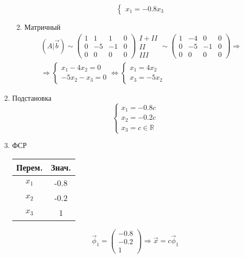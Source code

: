 \documentclass{article}
\begin{document}
\begin{enumerate}
\begin{enumerate}
\[\begin{cases}
			x_1 = -0.8x_3
		\end{cases}
		\]
		\item Матричный
		\begin{gather*}
			(A | \vec{b}) \sim \begin{pmatrix}
				1 & 1 & 1 & 0 \\
				0 & -5 & -1 & 0 \\
				0 & 0 & 0 & 0
			\end{pmatrix} \begin{matrix}
				 I + II \\ II \\ III
			\end{matrix} \sim
			\begin{pmatrix}
				1 & -4 & 0 & 0 \\
				0 & -5 & -1 & 0 \\
				0 & 0 & 0 & 0	
			\end{pmatrix} \Rightarrow \\
			\Rightarrow \begin{cases}
				x_1 - 4x_2 = 0 \\
				-5x_2 - x_3 = 0
			\end{cases} \Leftrightarrow \begin{cases}
				x_1 = 4x_2 \\
				x_3 = -5x_2
			\end{cases}
		\end{gather*}
	\end{enumerate}
	\item Подстановка
	\[
	\begin{cases}
		x_1 = -0.8c \\
		x_2 = -0.2c \\
		x_3 = c \in \mathbb{R}
	\end{cases}
	\]
	\item ФСР \\
	\begin{tabular}{c|c}
		Перем. & Знач. \\
		\hline
		$x_1$ & -0.8 \\
		$x_2$ & -0.2 \\
		$x_3$ & 1
	\end{tabular}
	\[
	\vec{\phi}_1 = \begin{pmatrix}
		-0.8 \\ -0.2 \\ 1
	\end{pmatrix} \Rightarrow
	\vec{x} = c \vec{\phi}_1
	\]
\end{enumerate}
\end{document}

